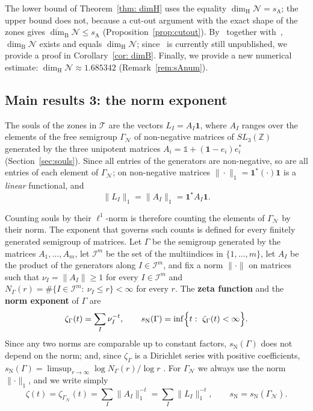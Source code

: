 \documentclass[11pt]{amsart}
\newcommand{\id}{\mathds{1}}
\theoremstyle{definition}
\theoremstyle{remark}
\newcommand{\one}{\mathbf 1}
\newcommand{\Z}{\mathbb Z}
\newcommand{\cN}{\mathcal N}
\newcommand{\cI}{\mathcal I}
\newcommand{\cT}{\mathcal T}
\newcommand{\GN}{\Gamma_{\mathcal N}}
\newcommand{\udimB}{\overline{\dim}_{\mathrm B}}
\newcommand{\sN}{s_{\mathrm N}}
\newcommand{\sA}{s_{\mathrm A}}
\newcommand{\dimH}{\dim_{\mathrm H}}
\newcommand{\dimB}{\dim_{\mathrm B}}
\newcommand{\norm}[1]{\lVert #1\rVert}
\begin{document}
The lower bound of Theorem~\ref{thm: dimH} uses the equality $\dimH\cN=\sA$; the upper bound does not, because a cut-out argument with the exact shape of the zones gives $\udimB\cN\le\sA$ (Proposition~\ref{prop:cutout}). 
By~\cite{Sew23} together with~\cite{JLPX23,Jur26}, $\dimB\cN$ exists and equals $\dimH\cN$; since~\cite{Sew23} is currently still unpublished, we provide a proof in Corollary~\ref{cor: dimB}.
Finally, we provide a new numerical estimate: $\dimH\cN\approx1.685342$ (Remark~\ref{rem:sAnum}).

\subsection*{Main results 3: the norm exponent}
The souls of the zones in $\cT$ are the vectors $L_I=A_I\one$, where $A_I$ ranges over the elements of the free semigroup $\GN$ of non-negative matrices of $SL_3(\Z)$ generated by the three unipotent matrices $A_i=\id+(\one-e_i)e_i^*$ (Section~\ref{sec:souls}). Since all entries of the generators are non-negative, so are all entries of each element of $\GN$; on non-negative matrices $\|\cdot\|_1=\one^*(\cdot)\one$ is a \emph{linear} functional, and
\[
  \|L_I\|_1=\|A_I\|_1=\one^* A_I\one .
\]

\medskip
Counting souls by their $\ell^1$-norm is therefore counting the elements of $\GN$ by their norm. The exponent that governs such counts is defined for every finitely generated semigroup of matrices. Let $\Gamma$ be the semigroup generated by the matrices $A_1,\dots,A_m$, let $\cI^m$ be the set of the multiindices in $\{1,\dots,m\}$, let $A_I$ be the product of the generators along $I\in\cI^m$, and fix a norm $\norm\cdot$ on matrices such that $\nu_I=\norm{A_I}\ge1$ for every $I\in\cI^m$ and $N_\Gamma(r)=\#\{I\in\cI^m:\ \nu_I\le r\}<\infty$ for every $r$. The \textbf{zeta function} and the \textbf{norm exponent} of $\Gamma$ \cite{DL12,DL15JGA} are
\[
  \zeta_\Gamma(t)=\sum_I\nu_I^{-t},\qquad
  \sN(\Gamma)=\inf\Bigl\{t:\ \zeta_\Gamma(t)<\infty\Bigr\}.
\]
Since any two norms are comparable up to constant factors, $\sN(\Gamma)$ does not depend on the norm; and, since $\zeta_\Gamma$ is a Dirichlet series with positive coefficients, $\sN(\Gamma)=\limsup_{r\to\infty}\log N_\Gamma(r)/\log r$ \cite[Thm.~3]{DL15JGA}. For $\GN$ we always use the norm $\norm\cdot_1$, and we write simply
\[
  \zeta(t)=\zeta_{\GN}(t)=\sum_I \|A_I\|_1^{-t}=\sum_I \|L_I\|_1^{-t},\qquad \sN=\sN(\GN).
\]
\end{document}
